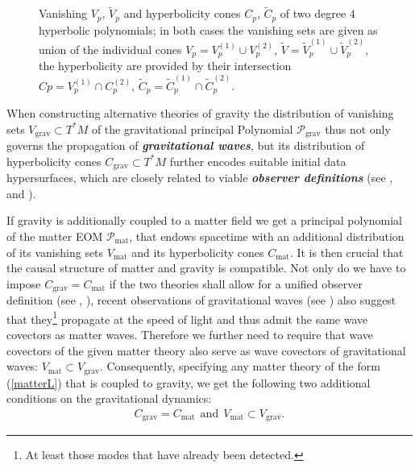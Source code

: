 \documentclass[%
 reprint,
nofootinbib,
 amsmath,amssymb,
 aps,
 prd,
floatfix,
]{revtex4-2}
\newcommand{\coneback}[4][]{
  \draw[canvas is xy plane at z=#2, #1] (45-#4:#3) arc (45-#4:225+#4:#3) -- (O) --cycle;
  }
\newcommand{\conefront}[4][]{
  \draw[canvas is xy plane at z=#2, #1] (45-#4:#3) arc (45-#4:-135+#4:#3) -- (O) --cycle;
  }
\begin{document}
\begin{figure}
\begin{minipage}{0.2\textwidth}
\begin{center}
\end{center}
\end{minipage}
    \caption{Vanishing $V_p$, $\widetilde{V}_p$ and hyperbolicity cones $C_p$, $\widetilde{C}_p$ of two degree $4$ hyperbolic polynomials; in both cases the vanishing sets are given as union of the individual cones $V_p = V_p^{(1)} \cup V_p^{(2)}$, $\widetilde{V} = \widetilde{V}_p^{(1)} \cup \widetilde{V}_p^{(2)}$, the hyperbolicity are provided by their intersection $Cp = V_p^{(1)} \cap C_p^{(2)}$,  $\widetilde{C}_p = \widetilde{C}_p^{(1)} \cap \widetilde{C}_p^{(2)}$.}
    \label{Poly}
\end{figure}

When constructing alternative theories of gravity the distribution of vanishing sets $V_{\text{grav}} \subset T^{\ast}M$ of the gravitational principal Polynomial $\mathcal{P}_{\text{grav}}$ thus not only governs the propagation of \textit{\textbf{gravitational waves}}, but its  distribution of hyperbolicity cones $C_{\text{grav}}\subset T^{\ast}M$ further encodes suitable initial data hypersurfaces, which are closely related to viable \textit{\textbf{observer definitions}} (see \cite{2018PhRvD..97h4036D}, \cite{2011PhRvD..83d4047R} and \cite{Rivera}). 

If gravity is additionally coupled to a matter field we get a principal polynomial of the matter EOM $\mathcal{P}_{\text{mat}}$, that endows spacetime with an additional distribution of its vanishing sets $V_{\text{mat}}$ and its hyperbolicity cones $C_{\text{mat}}$. It is then crucial that the causal structure of matter and gravity is compatible. 
Not only do we have to impose $C_{\text{grav}} = C_{\text{mat}}$ if the two theories shall allow for a unified observer definition (see \cite{Rivera}, \cite{2011PhRvD..83d4047R}), recent observations of gravitational waves (see \cite{2017ApJ...848L..13A}) also suggest that they\footnote{At least those modes that have already been detected.} propagate at the speed of light and thus admit the same wave covectors as matter waves.
Therefore we further need to require that wave covectors of the given matter theory also serve as wave covectors of gravitational waves: $V_{\text{mat}} \subset V_{\text{grav}}$.
Consequently, specifying any matter theory of the form (\ref{matterL}) that is coupled to gravity, we get the following two additional conditions on the gravitational dynamics:
\begin{align}\label{A2}
    C_{\text{grav}} = C_{\text{mat}} \ \ \text{and} \ \ V_{\text{mat}} \subset V_{\text{grav}}.\tag{Axiom 2}
\end{align}
\end{document}
